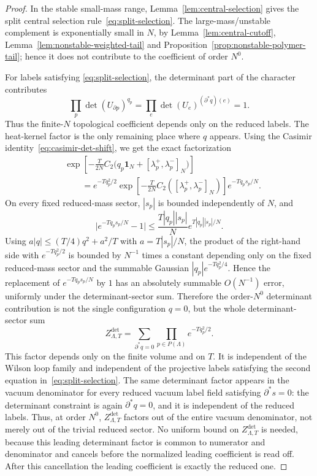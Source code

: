 \documentclass[11pt,a4paper,reqno]{amsart}
\theoremstyle{definition}
\theoremstyle{remark}
\begin{document}
\begin{proof}
In the stable small-mass range, Lemma~\ref{lem:central-selection} gives the split central selection rule~\eqref{eq:split-selection}.  The large-mass/unstable complement is exponentially small in $N$, by Lemma~\ref{lem:central-cutoff}, Lemma~\ref{lem:nonstable-weighted-tail} and Proposition~\ref{prop:nonstable-polymer-tail}; hence it does not contribute to the coefficient of order $N^0$.

For labels satisfying \eqref{eq:split-selection}, the determinant part of the character contributes
\[
\prod_p\det(U_{\partial p})^{q_p}
=\prod_e\det(U_e)^{(\partial^*q)(e)}=1.
\]
Thus the finite-$N$ topological coefficient depends only on the reduced labels.  The heat-kernel factor is the only remaining place where $q$ appears.  Using the Casimir identity~\eqref{eq:casimir-det-shift}, we get the exact factorization
\begin{align*}
&\exp\left[-\frac{T}{2N}C_2
\bigl(q_p\mathbf 1_N+[\lambda_p^+,\lambda_p^-]_N\bigr)\right]\\
&\qquad=
e^{-Tq_p^2/2}
\exp\left[-\frac{T}{2N}C_2([\lambda_p^+,\lambda_p^-]_N)\right]
e^{-Tq_ps_p/N}.
\end{align*}
On every fixed reduced-mass sector, $|s_p|$ is bounded independently of $N$, and
\[
\bigl|e^{-Tq_ps_p/N}-1\bigr|
\le \frac{T|q_p||s_p|}{N}e^{T|q_p||s_p|/N}.
\]
Using $a|q|\le (T/4)q^2+a^2/T$ with $a=T|s_p|/N$, the product of the right-hand side with $e^{-Tq_p^2/2}$ is bounded by $N^{-1}$ times a constant depending only on the fixed reduced-mass sector and the summable Gaussian $|q_p|e^{-Tq_p^2/4}$. Hence the replacement of $e^{-Tq_ps_p/N}$ by $1$ has an absolutely summable $O(N^{-1})$ error, uniformly under the determinant-sector sum.  Therefore the order-$N^0$ determinant contribution is not the single configuration $q=0$, but the whole determinant-sector sum
\begin{equation}\label{eq:z-det}
Z^{\det}_{\Lambda,T}=\sum_{\partial^*q=0}\prod_{p\in P(\Lambda)}e^{-Tq_p^2/2}.
\end{equation}
This factor depends only on the finite volume and on $T$.  It is independent of the Wilson loop family and independent of the projective labels satisfying the second equation in~\eqref{eq:split-selection}.  The same determinant factor appears in the vacuum denominator for every reduced vacuum label field satisfying $\partial^*s=0$: the determinant constraint is again $\partial^*q=0$, and it is independent of the reduced labels. Thus, at order $N^0$, $Z^{\det}_{\Lambda,T}$ factors out of the entire vacuum denominator, not merely out of the trivial reduced sector. No uniform bound on $Z^{\det}_{\Lambda,T}$ is needed, because this leading determinant factor is common to numerator and denominator and cancels before the normalized leading coefficient is read off.  After this cancellation the leading coefficient is exactly the reduced one.
\end{proof}
\end{document}
